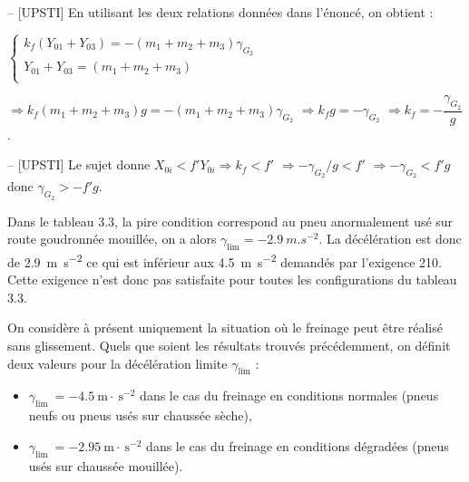 \ifprof
\begin{corrige}-- [UPSTI]
En utilisant les deux relations données dans l’énoncé, on obtient : 

$\left\{
\begin{array}{l}
k_f (Y_{01}+Y_{03} )=-(m_1+m_2+m_3 ) \gamma_{G_2 }\\
Y_{01}+Y_{03}=(m_1+m_2+m_3 ) \\
\end{array}
\right.$

$\Rightarrow k_f (m_1+m_2+m_3 )g=-(m_1+m_2+m_3 ) \gamma_{G_2}$
$\Rightarrow  k_f g=-\gamma_{G_2}$
$\Rightarrow  k_f =-\dfrac{\gamma_{G_2}}{g}$.


\end{corrige}
\else
\fi

\ifprof
\begin{corrige}-- [UPSTI]
Le sujet donne $X_{0i}<f'Y_{0i} \Rightarrow k_f<f'$ 
$\Rightarrow -\gamma_{G_2}/g<f'$ 
$\Rightarrow -\gamma_{G_2}<f'g$ 
donc $\gamma_{G_2}>-f'g$.

Dans le tableau 3.3, la pire condition correspond au pneu anormalement usé sur route goudronnée mouillée, on a alors $\gamma_{\text{lim}}=- \SI{2,9}{m.s^{-2}}$. La décélération est donc de \SI{2,9}{m.s^{-2}} ce qui est inférieur aux \SI{4,5}{m.s^{-2}} demandés par l’exigence 210. Cette exigence n’est donc pas satisfaite pour toutes les configurations du tableau 3.3.

\end{corrige}
\else
\fi

\ifprof\else

On considère à présent uniquement la situation où le freinage peut être réalisé sans glissement. Quels que soient les résultats trouvés précédemment, on définit deux valeurs pour la décélération limite \(\gamma_{\text{lim}}\) :

\begin{itemize}
  \item \(\gamma_{\text {lim }}=-4.5 \mathrm{~m} \cdot \mathrm{~s}^{-2}\) dans le cas du freinage en conditions normales (pneus neufs ou pneus usés sur chaussée sèche),
  \item \(\gamma_{\text {lim }}=-2.95 \mathrm{~m} \cdot \mathrm{~s}^{-2}\) dans le cas du freinage en conditions dégradées (pneus usés sur chaussée mouillée).
\end{itemize}

